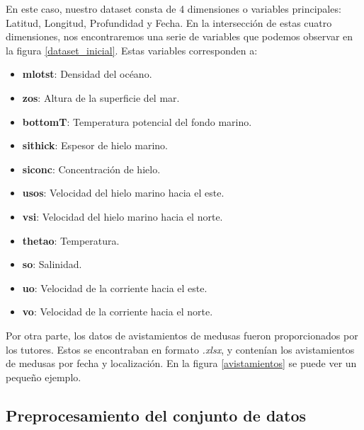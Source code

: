 En este caso, nuestro dataset consta de 4 dimensiones o variables principales: Latitud, Longitud, Profundidad y Fecha.
En la intersección de estas cuatro dimensiones, nos encontraremos una serie de variables que podemos observar en la figura \ref{dataset_inicial}. Estas variables corresponden a:
\begin{itemize}
	\setlength\itemsep{-1.5em}
	\item \textbf{mlotst}: Densidad del océano.\\
	\item \textbf{zos}: Altura de la superficie del mar.\\
	\item \textbf{bottomT}: Temperatura potencial del fondo marino.\\
	\item \textbf{sithick}: Espesor de hielo marino.\\
	\item \textbf{siconc}: Concentración de hielo.\\
	\item \textbf{usos}: Velocidad del hielo marino hacia el este.\\
	\item \textbf{vsi}: Velocidad del hielo marino hacia el norte.\\
	\item \textbf{thetao}: Temperatura.\\
	\item \textbf{so}: Salinidad.\\
	\item \textbf{uo}: Velocidad de la corriente hacia el este.\\
	\item \textbf{vo}: Velocidad de la corriente hacia el norte.
\end{itemize}

\label{dataset_inicial}

Por otra parte, los datos de avistamientos de medusas fueron proporcionados por los tutores. Estos se encontraban en formato \emph{.xlsx}, y contenían los avistamientos de medusas por fecha y localización. En la figura \ref{avistamientos} se puede ver un pequeño ejemplo.

\label{avistamientos}

\subsection{Preprocesamiento del conjunto de datos}

